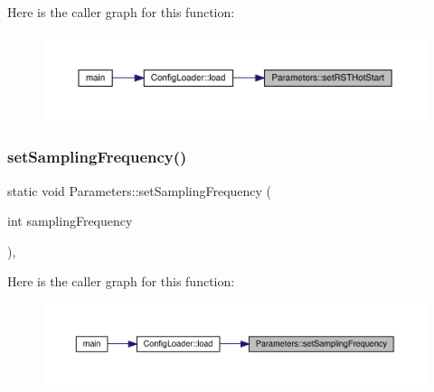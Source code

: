 Here is the caller graph for this function\+:
\nopagebreak
\begin{figure}[H]
\begin{center}
\leavevmode
\includegraphics[width=350pt]{class_parameters_a84d9a6f8a32bbe13f7abe045453700a0_icgraph}
\end{center}
\end{figure}
\mbox{\label{class_parameters_ae9fa4bf77247404758c43179849ae3bf}} 
\subsubsection{\texorpdfstring{setSamplingFrequency()}{setSamplingFrequency()}}
{\footnotesize\ttfamily static void Parameters\+::set\+Sampling\+Frequency (\begin{DoxyParamCaption}\item[{int}]{sampling\+Frequency }\end{DoxyParamCaption})\hspace{0.3cm}{\ttfamily [inline]}, {\ttfamily [static]}}

Here is the caller graph for this function\+:
\nopagebreak
\begin{figure}[H]
\begin{center}
\leavevmode
\includegraphics[width=350pt]{class_parameters_ae9fa4bf77247404758c43179849ae3bf_icgraph}
\end{center}
\end{figure}
\mbox{\label{class_parameters_a7ab55c1529015de4c5c182cfa9f004e8}} 
